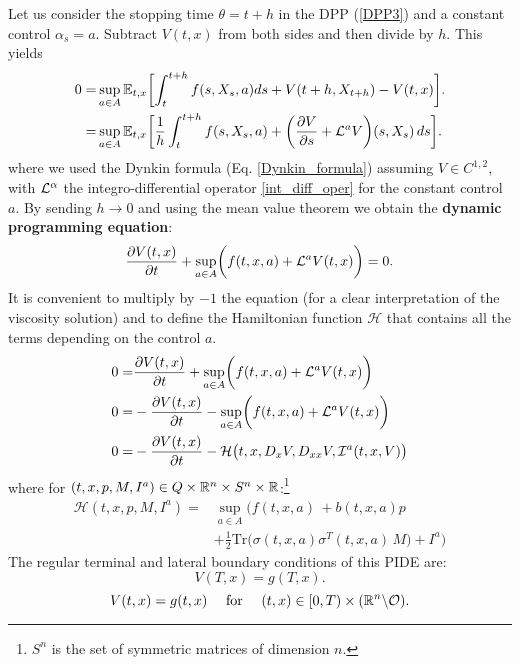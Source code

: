 \noindent
Let us consider the stopping time $\theta = t + h$ in the DPP (\ref{DPP3}) and a constant control $\alpha_s = a$. 
Subtract $V(t,x)$ from both sides and then divide by $h$. This yields
\begin{align*}
   0 =& \sup_{a \in A} \mathbb{E}_{t,x} \biggl[ \int_t^{t+h} f(s,X_s,a) ds + V(t+h, X_{t+h}) - V(t,x) \biggr]. \\ 
     =& \sup_{a \in A} \mathbb{E}_{t,x} \biggl[ \frac{1}{h} \int_t^{t+h} f(s,X_s,a) 
     + \biggl( \frac{\partial V}{\partial s} + \mathcal{L}^{a}V \biggr)(s, X_{s}) \, ds \biggr]. \\
\end{align*}
where we used the Dynkin formula (Eq. \ref{Dynkin_formula}) assuming $V \in C^{1,2}$, with $\mathcal{L}^{\alpha}$ the integro-differential operator \ref{int_diff_oper} 
for the constant control $a$.
By sending $h \to 0$ and using the mean value theorem we obtain the \textbf{dynamic programming equation}:
\begin{equation}\label{DPE}
 \frac{\partial V(t,x)}{\partial t} + \sup_{a \in A} \biggl( f(t,x,a) + \mathcal{L}^{a}V(t,x)  \biggr) = 0.
\end{equation}
It is convenient to multiply by $-1$ the equation (for a clear interpretation of the viscosity solution) and to define the Hamiltonian function $\mathcal{H}$ 
that contains all the terms depending on the control $a$.
\begin{align} \nonumber
 0 = & \frac{\partial V(t,x)}{\partial t} + \sup_{a \in A} \biggl( f(t,x,a) + \mathcal{L}^{a}V(t,x)  \biggr) \\ \nonumber
 0 = & - \frac{\partial V(t,x)}{\partial t} - \sup_{a \in A} \biggl( f(t,x,a) + \mathcal{L}^{a}V(t,x)  \biggr) \\ \label{DPE2}
 0 = & - \frac{\partial V(t,x)}{\partial t} - \mathcal{H}\bigl( t,x,D_x V, D_{xx} V, \mathcal{I}^a(t,x,V) \bigr) 
\end{align}
where for $(t,x,p,M,I^a) \in Q \times \mathbb{R}^n \times S^n \times \mathbb{R}$:\footnote{$S^n$ is the set of symmetric matrices of dimension $n$.} 
\begin{align}\label{Hamiltonian}
 \mathcal{H}(t,x,p,M,I^a) =& \sup_{a \in A} \biggl( f(t,x,a) \, + b(t,x,a) p \\ \nonumber
              &+ \frac{1}{2} \mbox{Tr} \bigl( \sigma(t,x,a)\sigma^T(t,x,a) \, M \bigr) +I^a \biggr) 
\end{align}
The regular terminal and lateral boundary conditions of this PIDE are: 
\begin{equation}\label{DPE_term_cond}
 V(T,x) = g(T,x).
\end{equation}
\begin{equation}\label{DPE_lateral_cond}
 V(t,x) = g(t,x) \quad \mbox{ for } \quad (t,x) \in [0,T)\times (\mathbb{R}^n \backslash \mathcal{O}). 
\end{equation}


